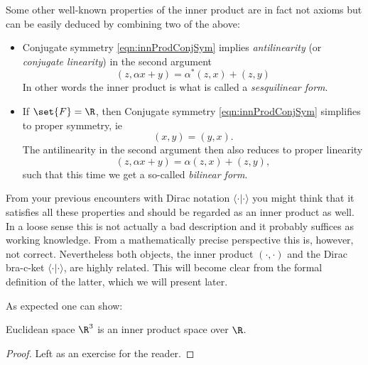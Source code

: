 \begin{rem}
	Some other well-known properties of the inner product are in fact not axioms but can be easily deduced by combining two of the above:
	\begin{itemize}
		\item Conjugate symmetry \eqref{eqn:innProdConjSym} implies \emph{antilinearity} (or \emph{conjugate linearity}) in the second argument
			\begin{equation}
				(z, \alpha x + y) = \alpha^\ast (z,x) + (z,y)
				\label{eqn:innProdAntiLinRight}
			\end{equation}
			In other words the inner product is what is called a \emph{sesquilinear form}.

		\item If $\set{F} = \R$, then Conjugate symmetry \eqref{eqn:innProdConjSym} simplifies to proper symmetry, ie
			\[ (x,y) = (y,x). \]
			The antilinearity in the second argument then also reduces to proper linearity
			\begin{equation}
				(z, \alpha x + y) = \alpha (z,x) + (z,y),
				\label{eqn:innProdLinRight}
			\end{equation}
			such that this time we get a so-called \emph{bilinear form}.
	\end{itemize}
\end{rem}

\begin{nte}
	From your previous encounters with Dirac notation $\langle \cdot | \cdot \rangle$ you might think that it satisfies all these properties and should be regarded as an inner product as well.
	In a loose sense this is not actually a bad description and it probably suffices as working knowledge.
	From a mathematically precise perspective this is, however, not correct. 
	Nevertheless both objects, the inner product $(\cdot,\cdot)$ and the Dirac bra-c-ket $\langle \cdot | \cdot \rangle$, are highly related. This will become clear from the formal definition of the latter, which we will present later.
\end{nte}

\noindent
As expected one can show:
\begin{prop}
	Euclidean space $\R^3$ is an inner product space over $\R$.
\end{prop}
\begin{proof}
	Left as an exercise for the reader.
\end{proof}

